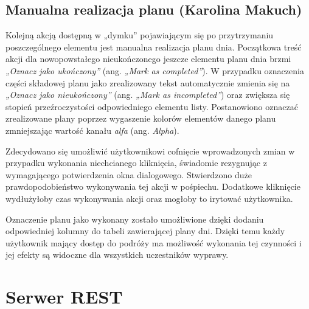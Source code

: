 \documentclass[10pt,twoside,a4paper]{report}
\begin{document}
\section{Manualna realizacja planu (Karolina Makuch)}
\par  Kolejną akcją dostępną w „dymku” pojawiającym się po przytrzymaniu poszczególnego elementu jest manualna realizacja planu dnia. Początkowa treść akcji dla nowopowstałego nieukończonego jeszcze elementu planu dnia brzmi \textit{„Oznacz jako ukończony”} (ang. \textit{„Mark as completed”}). W przypadku oznaczenia części składowej planu jako zrealizowany tekst automatycznie zmienia się na \textit{„Oznacz jako nieukończony”} (ang. \textit{„Mark as incompleted”}) oraz zwiększa się stopień przeźroczystości odpowiedniego elementu listy.  Postanowiono oznaczać zrealizowane plany poprzez wygaszenie kolorów elementów danego planu zmniejszając wartość kanału \textit{alfa} (ang. \textit{Alpha}).
 \par Zdecydowano się umożliwić użytkownikowi cofnięcie wprowadzonych zmian w przypadku wykonania niechcianego kliknięcia, świadomie rezygnując z wymagającego potwierdzenia okna dialogowego. Stwierdzono duże prawdopodobieństwo wykonywania tej akcji w pośpiechu. Dodatkowe kliknięcie wydłużyłoby czas wykonywania akcji oraz mogłoby to irytować użytkownika.
\par  Oznaczenie planu jako wykonany zostało umożliwione dzięki dodaniu odpowiedniej kolumny do tabeli zawierającej plany dni. Dzięki temu każdy użytkownik mający dostęp do podróży ma możliwość wykonania tej czynności i jej efekty są widoczne dla wszystkich uczestników wyprawy.


\chapter{Serwer REST}
\end{document}
